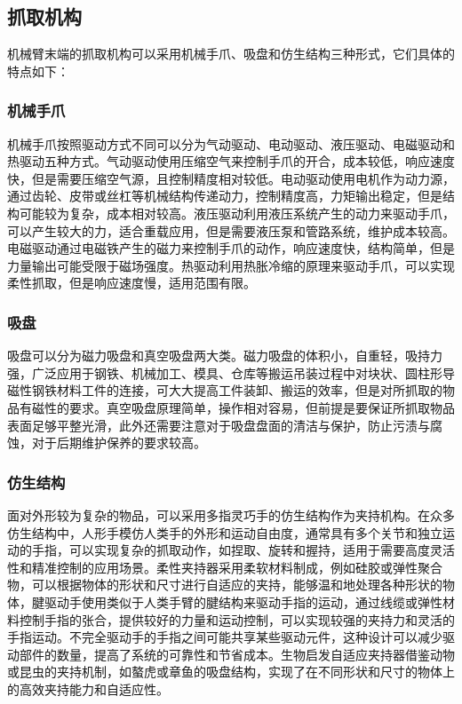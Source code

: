 \documentclass{report}
\begin{document}
\subsection{抓取机构}
\label{subsec:label}
机械臂末端的抓取机构可以采用机械手爪、吸盘和仿生结构三种形式，它们具体的特点如下：
\subsubsection{机械手爪}
\label{subsec:label}
机械手爪按照驱动方式不同可以分为气动驱动、电动驱动、液压驱动、电磁驱动和热驱动五种方式。气动驱动使用压缩空气来控制手爪的开合，成本较低，响应速度快，但是需要压缩空气源，且控制精度相对较低。电动驱动使用电机作为动力源，通过齿轮、皮带或丝杠等机械结构传递动力，控制精度高，力矩输出稳定，但是结构可能较为复杂，成本相对较高。液压驱动利用液压系统产生的动力来驱动手爪，可以产生较大的力，适合重载应用，但是需要液压泵和管路系统，维护成本较高。电磁驱动通过电磁铁产生的磁力来控制手爪的动作，响应速度快，结构简单，但是力量输出可能受限于磁场强度。热驱动利用热胀冷缩的原理来驱动手爪，可以实现柔性抓取，但是响应速度慢，适用范围有限。

\subsubsection{吸盘}
\label{subsec:label}
吸盘可以分为磁力吸盘和真空吸盘两大类。磁力吸盘的体积小，自重轻，吸持力强，广泛应用于钢铁、机械加工、模具、仓库等搬运吊装过程中对块状、圆柱形导磁性钢铁材料工件的连接，可大大提高工件装卸、搬运的效率，但是对所抓取的物品有磁性的要求。真空吸盘原理简单，操作相对容易，但前提是要保证所抓取物品表面足够平整光滑，此外还需要注意对于吸盘盘面的清洁与保护，防止污渍与腐蚀，对于后期维护保养的要求较高。
\subsubsection{仿生结构}
\label{subsec:label}
面对外形较为复杂的物品，可以采用多指灵巧手的仿生结构作为夹持机构。在众多仿生结构中，人形手模仿人类手的外形和运动自由度，通常具有多个关节和独立运动的手指，可以实现复杂的抓取动作，如捏取、旋转和握持，适用于需要高度灵活性和精准控制的应用场景。柔性夹持器采用柔软材料制成，例如硅胶或弹性聚合物，可以根据物体的形状和尺寸进行自适应的夹持，能够温和地处理各种形状的物体，腱驱动手使用类似于人类手臂的腱结构来驱动手指的运动，通过线缆或弹性材料控制手指的张合，提供较好的力量和运动控制，可以实现较强的夹持力和灵活的手指运动。不完全驱动手的手指之间可能共享某些驱动元件，这种设计可以减少驱动部件的数量，提高了系统的可靠性和节省成本。生物启发自适应夹持器借鉴动物或昆虫的夹持机制，如螯虎或章鱼的吸盘结构，实现了在不同形状和尺寸的物体上的高效夹持能力和自适应性。
\end{document}
